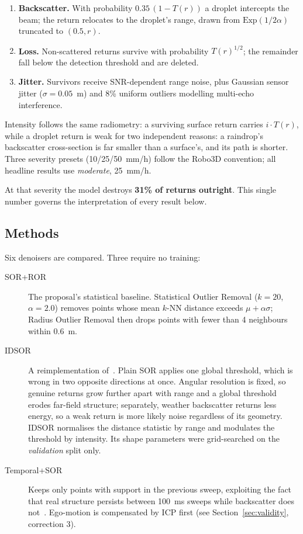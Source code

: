 \documentclass[11pt,a4paper]{article}
\begin{document}
\begin{enumerate}
\item \textbf{Backscatter.} With probability $0.35\,(1-T(r))$ a droplet
intercepts the beam; the return relocates to the droplet's range, drawn from
$\mathrm{Exp}(1/2\alpha)$ truncated to $(0.5, r)$.
\item \textbf{Loss.} Non-scattered returns survive with probability
$T(r)^{1/2}$; the remainder fall below the detection threshold and are
deleted.
\item \textbf{Jitter.} Survivors receive SNR-dependent range noise, plus
Gaussian sensor jitter ($\sigma=0.05$~m) and 8\% uniform outliers modelling
multi-echo interference.
\end{enumerate}

Intensity follows the same radiometry: a surviving surface return carries
$i\cdot T(r)$, while a droplet return is weak for two independent reasons:
a raindrop's backscatter cross-section is far smaller than a surface's, and
its path is shorter. Three severity presets (10/25/50~mm/h) follow the Robo3D
convention; all headline results use \emph{moderate}, 25~mm/h.

At that severity the model destroys \textbf{31\% of returns outright}. This
single number governs the interpretation of every result below.

\subsection{Methods}

Six denoisers are compared. Three require no training:

\begin{description}
\item[SOR+ROR] The proposal's statistical baseline. Statistical Outlier
Removal ($k=20$, $\alpha=2.0$) removes points whose mean $k$-NN distance
exceeds $\mu + \alpha\sigma$; Radius Outlier Removal then drops points with
fewer than 4 neighbours within 0.6~m.
\item[IDSOR] A reimplementation of~\cite{idsor}. Plain SOR applies one global
threshold, which is wrong in two opposite directions at once. Angular
resolution is fixed, so genuine returns grow further apart with range and a
global threshold erodes far-field structure; separately, weather backscatter
returns less energy, so a weak return is more likely noise regardless of its
geometry. IDSOR normalises the distance statistic by range and modulates the
threshold by intensity. Its shape parameters were grid-searched on the
\emph{validation} split only.
\item[Temporal+SOR] Keeps only points with support in the previous sweep,
exploiting the fact that real structure persists between 100~ms sweeps while
backscatter does not~\cite{4denoise}. Ego-motion is compensated by ICP first
(see Section~\ref{sec:validity}, correction 3).
\end{description}
\end{document}
